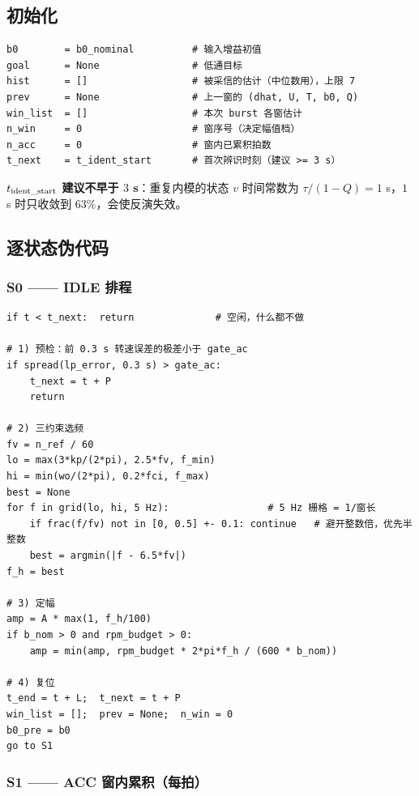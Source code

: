 \documentclass[11pt,a4paper]{ctexart}
\begin{document}
\subsection{初始化}

\begin{verbatim}
b0        = b0_nominal          # 输入增益初值
goal      = None                # 低通目标
hist      = []                  # 被采信的估计（中位数用），上限 7
prev      = None                # 上一窗的 (dhat, U, T, b0, Q)
win_list  = []                  # 本次 burst 各窗估计
n_win     = 0                   # 窗序号（决定幅值档）
n_acc     = 0                   # 窗内已累积拍数
t_next    = t_ident_start       # 首次辨识时刻（建议 >= 3 s）
\end{verbatim}

\textbf{$t_{\rm ident\_start}$ 建议不早于 $3$ s}：重复内模的状态 $v$ 时间常数为
$\tau/(1-Q)=1$ s，$1$ s 时只收敛到 $63\%$，会使反演失效。

\subsection{逐状态伪代码}

\subsubsection*{S0 —— IDLE 排程}

\begin{verbatim}
if t < t_next:  return              # 空闲，什么都不做

# 1) 预检：前 0.3 s 转速误差的极差小于 gate_ac
if spread(lp_error, 0.3 s) > gate_ac:
    t_next = t + P
    return

# 2) 三约束选频
fv = n_ref / 60
lo = max(3*kp/(2*pi), 2.5*fv, f_min)
hi = min(wo/(2*pi), 0.2*fci, f_max)
best = None
for f in grid(lo, hi, 5 Hz):                 # 5 Hz 栅格 = 1/窗长
    if frac(f/fv) not in [0, 0.5] +- 0.1: continue   # 避开整数倍，优先半整数
    best = argmin(|f - 6.5*fv|)
f_h = best

# 3) 定幅
amp = A * max(1, f_h/100)
if b_nom > 0 and rpm_budget > 0:
    amp = min(amp, rpm_budget * 2*pi*f_h / (600 * b_nom))

# 4) 复位
t_end = t + L;  t_next = t + P
win_list = [];  prev = None;  n_win = 0
b0_pre = b0
go to S1
\end{verbatim}

\subsubsection*{S1 —— ACC 窗内累积（每拍）}
\end{document}

